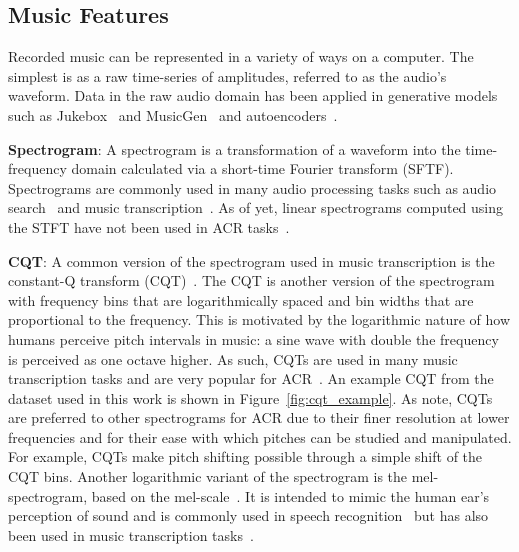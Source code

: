 \subsection{Music Features}\label{sec:background-features}

Recorded music can be represented in a variety of ways on a computer. The simplest is as a raw time-series of amplitudes, referred to as the audio's waveform. Data in the raw audio domain has been applied in generative models such as Jukebox~\citep{Jukebox} and MusicGen~\citep{MusicGen} and autoencoders~\citep{Encodec}.

\textbf{Spectrogram}: A spectrogram is a transformation of a waveform into the time-frequency domain calculated via a short-time Fourier transform (SFTF). Spectrograms are commonly used in many audio processing tasks such as audio search~\citep{ShazamSpectrogram} and music transcription~\citep{PianoTranscriptionWithTransformer}. As of yet, linear spectrograms computed using the STFT have not been used in ACR tasks~\citep{20YearsofACR}.

\textbf{CQT}: A common version of the spectrogram used in music transcription is the constant-Q transform (CQT)~\citep{CQT}. The CQT is another version of the spectrogram with frequency bins that are logarithmically spaced and bin widths that are proportional to the frequency. This is motivated by the logarithmic nature of how humans perceive pitch intervals in music: a sine wave with double the frequency is perceived as one octave higher. As such, CQTs are used in many music transcription tasks and are very popular for ACR~\citep{FirstDeepLearningCQT,StructuredTraining}. An example CQT from the dataset used in this work is shown in Figure~\ref{fig:cqt_example}. As \citet{SaliencyChroma} note, CQTs are preferred to other spectrograms for ACR due to their finer resolution at lower frequencies and for their ease with which pitches can be studied and manipulated. For example, CQTs make pitch shifting possible through a simple shift of the CQT bins. Another logarithmic variant of the spectrogram is the mel-spectrogram, based on the mel-scale~\citep{MelScale}. It is intended to mimic the human ear's perception of sound and is commonly used in speech recognition~\citep{SpeechProcessingMels} but has also been used in music transcription tasks~\citep{MelodyTranscriptionViaGenerativePreTraining}.



